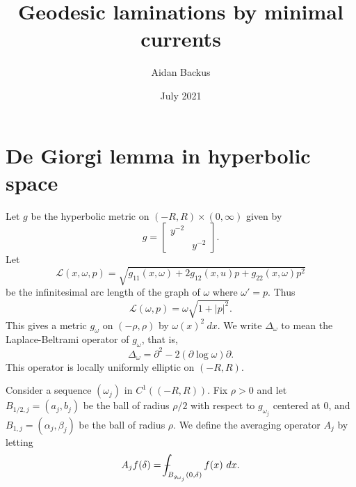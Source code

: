 \documentclass[reqno,12pt,letterpaper]{amsart}
\title[Geodesic laminations by minimal currents]{Geodesic laminations by minimal currents}
\author{Aidan Backus}
\date{July 2021}
\theoremstyle{definition}
\numberwithin{equation}{section}
\def\Xint#1{\mathchoice
{\XXint\displaystyle\textstyle{#1}}%
{\XXint\textstyle\scriptstyle{#1}}%
{\XXint\scriptstyle\scriptscriptstyle{#1}}%
{\XXint\scriptscriptstyle\scriptscriptstyle{#1}}%
\!\int}
\def\XXint#1#2#3{{\setbox0=\hbox{$#1{#2#3}{\int}$ }
\vcenter{\hbox{$#2#3$ }}\kern-.6\wd0}}
\def\dashint{\Xint-}
\begin{document}


\section{De Giorgi lemma in hyperbolic space}
Let $g$ be the hyperbolic metric on $(-R, R) \times (0, \infty)$ given by
$$g = \begin{bmatrix}y^{-2} \\ & y^{-2}\end{bmatrix}.$$
Let
$$\mathscr L(x, \omega, p) = \sqrt{g_{11}(x, \omega) + 2g_{12}(x, u)p + g_{22}(x, \omega) p^2}$$
be the infinitesimal arc length of the graph of $\omega$ where $\omega' = p$.
Thus
$$\mathscr L(\omega, p) = \omega \sqrt{1 + |p|^2}.$$
This gives a metric $g_\omega$ on $(-\rho, \rho)$ by $\omega(x)^2 ~dx$.
We write $\Delta_\omega$ to mean the Laplace-Beltrami operator of $g_\omega$, that is,
$$\Delta_\omega = \partial^2 - 2(\partial \log \omega) \partial.$$
This operator is locally uniformly elliptic on $(-R, R)$.

Consider a sequence $(\omega_j)$ in $C^1((-R, R))$.
Fix $\rho > 0$ and let $B_{1/2,j} = (a_j, b_j)$ be the ball of radius $\rho/2$ with respect to $g_{\omega_j}$ centered at $0$, and $B_{1,j} = (\alpha_j, \beta_j)$ be the ball of radius $\rho$.
We define the averaging operator $A_j$ by letting
$$A_jf(\delta) = \dashint_{B_{g_{\omega_j}}(0, \delta)} f(x) ~dx.$$
\end{document}
